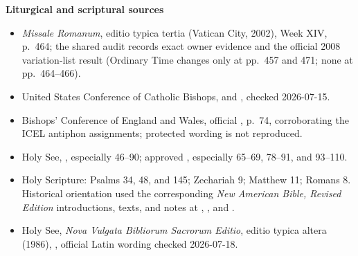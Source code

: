 \textbf{Liturgical and scriptural sources}
{\footnotesize
\begin{itemize}[itemsep=0em,topsep=0.15em,parsep=0pt]
\item \emph{Missale Romanum}, editio typica tertia (Vatican City, 2002), Week XIV, p.~464; the shared audit records exact owner evidence and the official 2008 variation-list result (Ordinary Time changes only at pp.~457 and 471; none at pp.~464--466).
\item United States Conference of Catholic Bishops,  and , checked 2026-07-15.
\item Bishops' Conference of England and Wales, official , p.~74, corroborating the ICEL antiphon assignments; protected wording is not reproduced.
\item Holy See, , especially 46--90; approved , especially 65--69, 78--91, and 93--110.
\item Holy Scripture: Psalms 34, 48, and 145; Zechariah 9; Matthew 11; Romans 8. Historical orientation used the corresponding \emph{New American Bible, Revised Edition} introductions, texts, and notes at , , and .
\item Holy See, \emph{Nova Vulgata Bibliorum Sacrorum Editio}, editio typica altera (1986), , official Latin wording checked 2026-07-18.
\end{itemize}}

